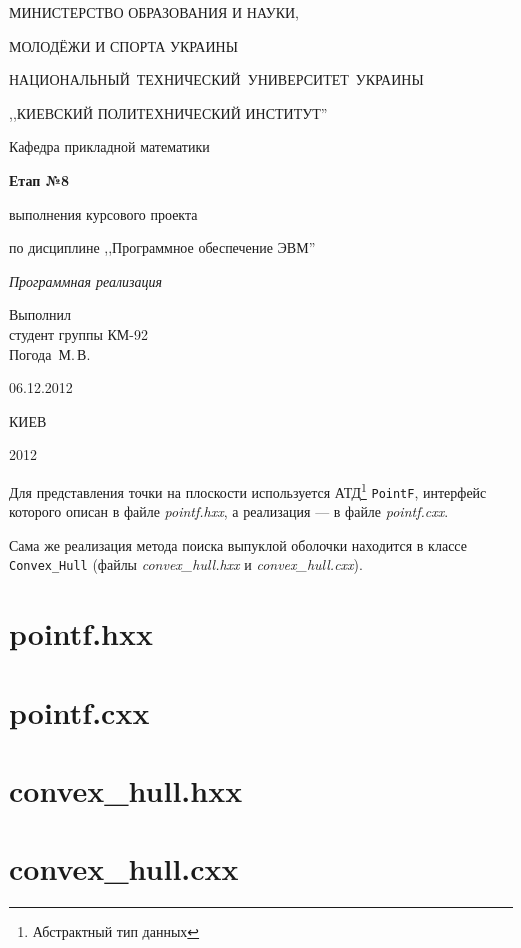 \documentclass[a4paper,12pt,notitlepage,headsepline,pdftex]{scrartcl}
\begin{document}
\begin{titlepage}
  \begin{center}
    \large
    \MakeUppercase{Министерство образования и науки,}

    \MakeUppercase{молодёжи и спорта Украины}

    \mbox{\MakeUppercase{Национальный технический университет Украины}}

    \MakeUppercase{,,Киевский политехнический институт''}

    \addvspace{6pt}

    \normalsize
    Кафедра прикладной математики

    \vfill

    \textbf{Етап №8}

    выполнения курсового проекта

    по дисциплине ,,Программное обеспечение ЭВМ''

    \emph{Программная реализация}
  \end{center}

  \vfill

  \noindent
  Выполнил\\
  студент группы КМ-92\\
  Погода~М.\,В.\\
  \vfill

  06.12.2012

  \vfill

  \begin{center}
    КИЕВ

    2012
  \end{center}
\end{titlepage}

Для представления точки на плоскости используется АТД\footnote{Абстрактный тип
данных} \texttt{PointF}, интерфейс которого описан в файле
\textit{pointf.hxx}, а реализация --- в файле \textit{pointf.cxx}.

Сама же реализация метода поиска выпуклой оболочки находится в классе
\texttt{Convex\_Hull} (файлы \textit{convex\_hull.hxx} и
\textit{convex\_hull.cxx}).

\section*{pointf.hxx}

\section*{pointf.cxx}

\section*{convex\_hull.hxx}

\section*{convex\_hull.cxx}

\end{document}
